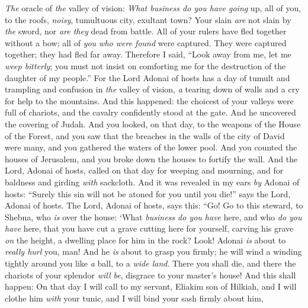 \begin{biblechapter} %
 \textit{The} oracle of \textit{the} valley of vision: \textit{What business do you have going} up, all of you, to the roofs,
\verse \textit{noisy}, tumultuous city, 
exultant town? 
Your slain \textit{are} not slain by \textit{the} sword, 
nor \textit{are they} dead from battle.
\verse All of your rulers have fled together without a bow; 
all of \textit{you who were found} were captured. 
They were captured together; 
they had fled far away.
\verse Therefore I said,
\verse “Look away from me, 
let me \textit{weep bitterly}; 
you must not insist on comforting me 
for the destruction of the daughter of my people.”
\verse For the Lord Adonai of hosts has a day of tumult and trampling and confusion in \textit{the} valley of vision, 
\textit{a} tearing down of walls and a cry for help to the mountains.
\verse And this happened:
\verse the choicest of your valleys were full of chariots, 
and the cavalry confidently stood at the gate.
\verse And he uncovered the covering of Judah. 
And you looked, on that day, to the weapons of the House of the Forest,
\verse and you saw that the breaches in the walls of the city of David were many, 
and you gathered the waters of the lower pool.
\verse And you counted the houses of Jerusalem, 
and you broke down the houses to fortify the wall.
\verse And the Lord, Adonai of hosts, called on that day
\verse for weeping and mourning, 
and for baldness and girding \textit{with} sackcloth.
\verse And it was revealed in my ears \textit{by} Adonai of hosts: “Surely this sin will not be atoned for you until you die!” 
says the Lord, Adonai of hosts.
 The Lord, Adonai of hosts, says this:
\verse “Go! Go to this steward, to Shebna, 
who \textit{is} over the house:
\verse ‘What \textit{business do you have} here, 
and who \textit{do you have} here, 
that you have cut a grave cutting here for yourself, 
carving his grave \textit{on} the height, 
a dwelling place for him in the rock?
\verse Look! Adonai \textit{is} about to \textit{really hurl} you, man! 
And he \textit{is} about to grasp you firmly;
\verse he will wind a winding tightly around you like \textit{a} ball, to a \textit{wide land}. 
There you shall die, 
and there the chariots of your splendor \textit{will be}, 
disgrace to your master’s house!
\verse And this shall happen:
\verse On that day I will call to my servant, Eliakim son of Hilkiah,
\verse and I will clothe him \textit{with} your tunic, 
and I will bind your sash firmly about him, 

\end{biblechapter}

